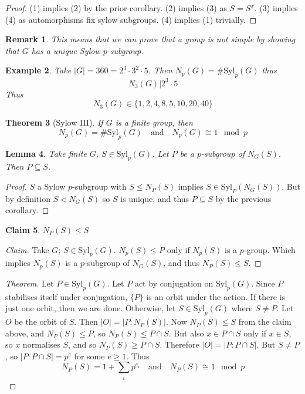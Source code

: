 \documentclass[a4paper,10pt]{article}
\newtheorem{thm}{Theorem}
\newtheorem{cl}[thm]{Claim}
\newtheorem{eg}[thm]{Example}
\newtheorem{Lem}[thm]{Lemma}
\newtheorem{rem}[thm]{Remark}
\begin{document}
\begin{proof}
(1) implies (2) by the prior corollary. (2) implies (3) as $S = S^x$. (3) implies (4) as automorphisms fix sylow subgroups. (4) implies (1) trivially. 
\end{proof}

\begin{rem}
This means that we can prove that a group is not simple by showing that $G$ has a unique Sylow $p$-subgroup.
\end{rem}

\begin{eg}
Take $|G| = 360 = 2^3 \cdot 3^2 \cdot 5$. Then $N_p(G) = \# \text{Syl}_p(G)$ thus
\[ N_3(G) \big| 2^3 \cdot 5 \]
Thus 
\[ N_3(G) \in \{ 1,2,4,8,5,10,20,40\} \]
\end{eg}


\begin{thm}[Sylow III]
If $G$ is a finite group, then
\[ N_p(G) = \# \text{Syl}_p(G) \quad \text{and} \quad N_p(G) \cong 1 \mod p \]
\end{thm}

\begin{Lem}
Take finite $G$, $S \in \text{Syl}_p(G)$. Let $P$ be a $p$-subgroup of $N_G(S)$. Then $P \subseteq S$. 
\end{Lem}
\begin{proof}
$S$ a Sylow $p$-subgroup with $S \leq N_P(S)$ implies $S \in \text{Syl}_P(N_G(S))$. But by definition $S \triangleleft N_G(S)$ so $S$ is unique, and thus $P \subseteq S$ by the previous corollary. 
\end{proof}

\begin{cl}
$N_P(S) \leq S$
\end{cl}
\begin{proof}[Claim]
Take $G$; $S \in \text{Syl}_p(G)$. $N_p(S) \leq P$ only if $N_p(S)$ is a $p$-group. Which implies $N_p(S)$ is a $p$-subgroup of $N_G(S)$, and thus $N_P(S) \leq S$. 
\end{proof}

\begin{proof}[Theorem]
Let $P \in \text{Syl}_p(G)$. Let $P$ act by conjugation on $\text{Syl}_p(G)$. Since $P$ stabilises itself under conjugation, $\{P\}$ is an orbit under the action. If there is just one orbit, then we are done. Otherwise, let $S \in \text{Syl}_p(G)$ where $S \neq P$. Let $O$ be the orbit of $S$. Then $|O| = |P : N_P(S)|$. Now $N_P(S) \leq S$ from the claim above, and $N_P(S) \leq P$, so $N_P(S) \leq P \cap S$. But also $x \in P \cap S$ only if $x \in S$, so $x$ normalises $S$, and so $N_P(S) \geq P \cap S$. Therefore $|O| = |P : P\cap S|$. But $S \neq P$, so $|P : P \cap S| = p^e$ for some $e \geq 1$. Thus
\[ N_P(S) = 1 + \sum_i p^{e_i} \quad \text{and} \quad N_P(S) \cong 1 \mod p \]
\end{proof}
\end{document}
